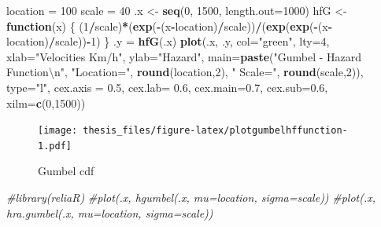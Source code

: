 \documentclass[12pt,oneside]{reedthesis}
\newenvironment{Shaded}{\begin{snugshade}}{\end{snugshade}}
\newcommand{\CharTok}[1]{\textcolor[rgb]{0.31,0.60,0.02}{#1}}
\newcommand{\CommentTok}[1]{\textcolor[rgb]{0.56,0.35,0.01}{\textit{#1}}}
\newcommand{\ControlFlowTok}[1]{\textcolor[rgb]{0.13,0.29,0.53}{\textbf{#1}}}
\newcommand{\DataTypeTok}[1]{\textcolor[rgb]{0.13,0.29,0.53}{#1}}
\newcommand{\DecValTok}[1]{\textcolor[rgb]{0.00,0.00,0.81}{#1}}
\newcommand{\FloatTok}[1]{\textcolor[rgb]{0.00,0.00,0.81}{#1}}
\newcommand{\KeywordTok}[1]{\textcolor[rgb]{0.13,0.29,0.53}{\textbf{#1}}}
\newcommand{\NormalTok}[1]{#1}
\newcommand{\OperatorTok}[1]{\textcolor[rgb]{0.81,0.36,0.00}{\textbf{#1}}}
\newcommand{\StringTok}[1]{\textcolor[rgb]{0.31,0.60,0.02}{#1}}
\begin{document}
\footnotesize
\begin{Shaded}
\begin{Highlighting}[]
\NormalTok{location =}\StringTok{ }\DecValTok{100}
\NormalTok{scale =}\StringTok{ }\DecValTok{40}
\NormalTok{.x <-}\StringTok{ }\KeywordTok{seq}\NormalTok{(}\DecValTok{0}\NormalTok{, }\DecValTok{1500}\NormalTok{, }\DataTypeTok{length.out=}\DecValTok{1000}\NormalTok{)}
\NormalTok{hfG <-}\StringTok{ }\ControlFlowTok{function}\NormalTok{(x) \{}
\NormalTok{  (}\DecValTok{1}\OperatorTok{/}\NormalTok{scale)}\OperatorTok{*}\NormalTok{(}\KeywordTok{exp}\NormalTok{(}\OperatorTok{-}\NormalTok{(x}\OperatorTok{-}\NormalTok{location)}\OperatorTok{/}\NormalTok{scale))}\OperatorTok{/}\NormalTok{(}\KeywordTok{exp}\NormalTok{(}\KeywordTok{exp}\NormalTok{(}\OperatorTok{-}\NormalTok{(x}\OperatorTok{-}\NormalTok{location)}\OperatorTok{/}\NormalTok{scale))}\OperatorTok{-}\DecValTok{1}\NormalTok{)}
\NormalTok{  \}}
\NormalTok{.y =}\StringTok{ }\KeywordTok{hfG}\NormalTok{(.x)}
\KeywordTok{plot}\NormalTok{(.x, .y, }\DataTypeTok{col=}\StringTok{"green"}\NormalTok{, }\DataTypeTok{lty=}\DecValTok{4}\NormalTok{, }
     \DataTypeTok{xlab=}\StringTok{"Velocities Km/h"}\NormalTok{, }\DataTypeTok{ylab=}\StringTok{"Hazard"}\NormalTok{, }
     \DataTypeTok{main=}\KeywordTok{paste}\NormalTok{(}\StringTok{"Gumbel - Hazard Function}\CharTok{\textbackslash{}n}\StringTok{"}\NormalTok{, }\StringTok{"Location="}\NormalTok{, }
     \KeywordTok{round}\NormalTok{(location,}\DecValTok{2}\NormalTok{), }\StringTok{" Scale="}\NormalTok{, }\KeywordTok{round}\NormalTok{(scale,}\DecValTok{2}\NormalTok{)), }\DataTypeTok{type=}\StringTok{"l"}\NormalTok{, }
     \DataTypeTok{cex.axis =} \FloatTok{0.5}\NormalTok{, }\DataTypeTok{cex.lab=} \FloatTok{0.6}\NormalTok{, }\DataTypeTok{cex.main=}\FloatTok{0.7}\NormalTok{, }\DataTypeTok{cex.sub=}\FloatTok{0.6}\NormalTok{, }
     \DataTypeTok{xilm=}\KeywordTok{c}\NormalTok{(}\DecValTok{0}\NormalTok{,}\DecValTok{1500}\NormalTok{))}
\end{Highlighting}
\end{Shaded}
\begin{figure}
\centering
\texttt{[image: thesis\_files/figure-latex/plotgumbelhffunction-1.pdf]}
\caption{\label{fig:plotgumbelhffunction}Gumbel cdf}
\end{figure}
\begin{Shaded}
\begin{Highlighting}[]
\CommentTok{#library(reliaR)}
\CommentTok{#plot(.x, hgumbel(.x, mu=location, sigma=scale))}
\CommentTok{#plot(.x, hra.gumbel(.x, mu=location, sigma=scale))}
\end{Highlighting}
\end{Shaded}
\normalsize
\end{document}

